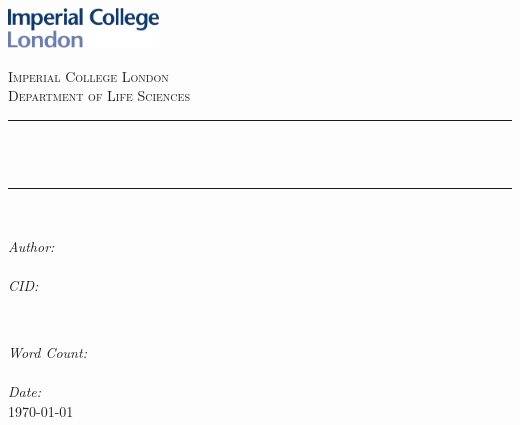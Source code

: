 \begin{titlepage}
    
    \newcommand{\HRule}{\rule{\linewidth}{0.5mm}} %
    
    
    \includegraphics[width = 4cm]{../Writeup/imperial.pdf}\\[0.5cm] 
    
    \center %
    
    
    \textsc{\Large Imperial College London}\\[0.5cm] 
    \textsc{\large Department of Life Sciences}\\[0.5cm] 
    
    
    \HRule \\[0.4cm]
    { \huge \bfseries \reporttitle}\\ %
    \HRule \\[1.5cm]
     
    
    \begin{minipage}{0.4\textwidth}
    \begin{flushleft} \large
    \emph{Author:}\\
    \reportauthor \\ [0.5cm] %
    \emph{CID:}\\
    \reportcid %
    \end{flushleft}
    \end{minipage}
    ~
    \begin{minipage}{0.4\textwidth}
    \begin{flushright} \large
    \emph{Word Count:} \\
    \words \\ [0.5cm] %
    \emph{Date:} \\
    \today \\ [0.5cm] %
    \end{flushright}
    \end{minipage}\\[4cm]
    

\end{titlepage}
